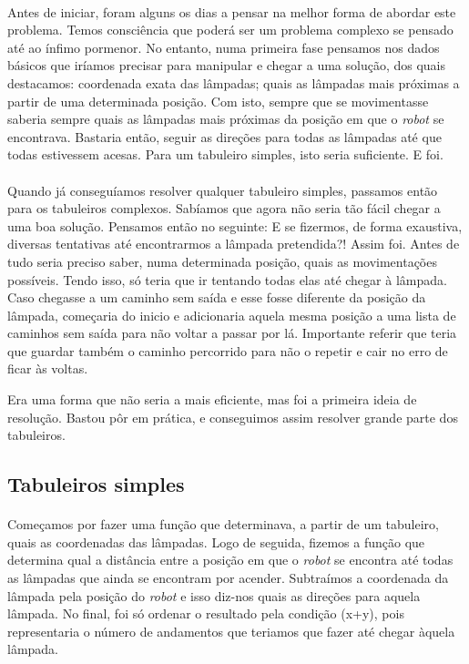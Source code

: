 \documentclass[a4paper,12pt]{article}
\begin{document}
\paragraph{}
Antes de iniciar, foram alguns os dias a pensar na melhor forma de abordar este problema. Temos consciência que poderá ser um problema complexo se pensado até ao ínfimo pormenor. No entanto, numa primeira fase pensamos nos dados básicos que iríamos precisar para manipular e chegar a uma solução, dos quais destacamos: coordenada exata das lâmpadas; quais as lâmpadas mais próximas a partir de uma determinada posição. Com isto, sempre que se movimentasse saberia sempre quais as lâmpadas mais próximas da posição em que o \emph{robot} se encontrava.
Bastaria então, seguir as direções para todas as lâmpadas até que todas estivessem acesas. Para um tabuleiro simples, isto seria suficiente. E foi.

\paragraph{}
Quando já conseguíamos resolver qualquer tabuleiro simples, passamos então para os tabuleiros complexos. Sabíamos que agora não seria tão fácil chegar a uma boa solução. Pensamos então no seguinte: E se fizermos, de forma exaustiva, diversas tentativas até encontrarmos a lâmpada pretendida?! Assim foi. Antes de tudo seria preciso saber, numa determinada posição, quais as movimentações possíveis. Tendo isso, só teria que ir tentando todas elas até chegar à lâmpada. Caso chegasse a um caminho sem saída e esse fosse diferente da posição da lâmpada, começaria do inicio e adicionaria aquela mesma posição a uma lista de caminhos sem saída para não voltar a passar por lá. Importante referir que teria que guardar também o caminho percorrido para não o repetir e cair no erro de ficar às voltas.

Era uma forma que não seria a mais eficiente, mas foi a primeira ideia de resolução. Bastou pôr em prática, e conseguimos assim resolver grande parte dos tabuleiros.

\subsection{Tabuleiros simples}

\paragraph{}

Começamos por fazer uma função que determinava, a partir de um tabuleiro, quais as coordenadas das lâmpadas. Logo de seguida, fizemos a função que determina qual a distância entre a posição em que o \emph{robot} se encontra até todas as lâmpadas que ainda se encontram por acender. Subtraímos a coordenada da lâmpada pela posição do \emph{robot} e isso diz-nos quais as direções para aquela lâmpada. No final, foi só ordenar o resultado pela condição (x+y), pois representaria o número de andamentos que teriamos que fazer até chegar àquela lâmpada.
\end{document}
